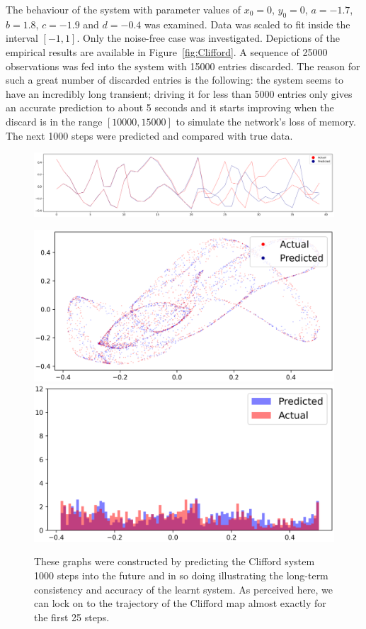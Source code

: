 The behaviour of the system with parameter values of $x_0=0$, $y_0=0$, $a = -1.7$,  $b = 1.8$, $c = -1.9$ and $d = -0.4$ was examined. 
Data was scaled to fit inside the interval $[-1,1]$. Only the noise-free case was investigated. 
Depictions of the empirical results are available in Figure~\ref{fig:Clifford}.
 A sequence of 25000 observations was fed into the system with 15000 entries discarded. 
 The reason for such a great number of discarded entries is the following: the system seems to have an incredibly long transient; driving it for less than 5000 entries only gives an accurate prediction to about 5 seconds and it starts improving when the discard is in the range $[10000,15000]$ to simulate the network's loss of memory. The next 1000 steps were predicted and compared with true data.


\begin{figure}[ht]
  \centering
  \includegraphics[width=\textwidth,left]{Graphs/_Clifford_1_nonoise.eps}
  \caption*{These graphs were constructed by predicting the Clifford system 1000 steps into the future and in so doing illustrating the long-term consistency and accuracy of the learnt system. As perceived here, we can lock on to the trajectory of the Clifford map almost exactly for the first 25 steps.}
      \centering
      \includegraphics[width=\linewidth]{Graphs/_Clifford_2_nonoise.eps}
  \endminipage\hfill
    \centering
    \includegraphics[width=\linewidth]{Graphs/_Clifford_3_nonoise.eps}

\end{figure}
